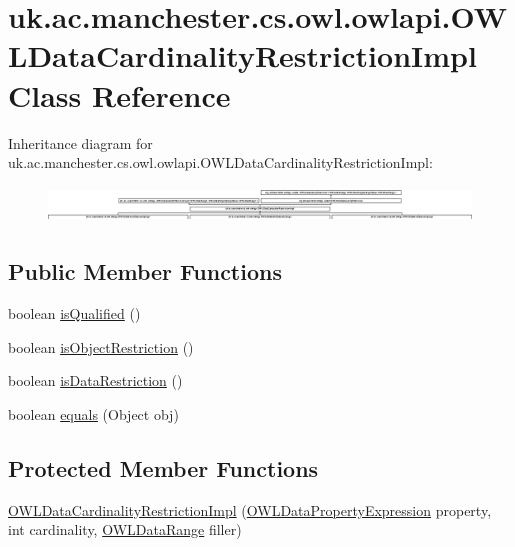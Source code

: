 \hypertarget{classuk_1_1ac_1_1manchester_1_1cs_1_1owl_1_1owlapi_1_1_o_w_l_data_cardinality_restriction_impl}{\section{uk.\-ac.\-manchester.\-cs.\-owl.\-owlapi.\-O\-W\-L\-Data\-Cardinality\-Restriction\-Impl Class Reference}
\label{classuk_1_1ac_1_1manchester_1_1cs_1_1owl_1_1owlapi_1_1_o_w_l_data_cardinality_restriction_impl}
}
Inheritance diagram for uk.\-ac.\-manchester.\-cs.\-owl.\-owlapi.\-O\-W\-L\-Data\-Cardinality\-Restriction\-Impl\-:\begin{figure}[H]
\begin{center}
\leavevmode
\includegraphics[height=0.965934cm]{classuk_1_1ac_1_1manchester_1_1cs_1_1owl_1_1owlapi_1_1_o_w_l_data_cardinality_restriction_impl}
\end{center}
\end{figure}
\subsection*{Public Member Functions}
\begin{DoxyCompactItemize}
\item 
boolean \hyperlink{classuk_1_1ac_1_1manchester_1_1cs_1_1owl_1_1owlapi_1_1_o_w_l_data_cardinality_restriction_impl_acfef886d21539b2b92979103cde62ceb}{is\-Qualified} ()
\item 
boolean \hyperlink{classuk_1_1ac_1_1manchester_1_1cs_1_1owl_1_1owlapi_1_1_o_w_l_data_cardinality_restriction_impl_af54b46b0237a6928287de2c943ef36b1}{is\-Object\-Restriction} ()
\item 
boolean \hyperlink{classuk_1_1ac_1_1manchester_1_1cs_1_1owl_1_1owlapi_1_1_o_w_l_data_cardinality_restriction_impl_ab6c2babe6c708512d0b023c000a4e015}{is\-Data\-Restriction} ()
\item 
boolean \hyperlink{classuk_1_1ac_1_1manchester_1_1cs_1_1owl_1_1owlapi_1_1_o_w_l_data_cardinality_restriction_impl_a544695b3169c60a0f6e4ab1f11d48165}{equals} (Object obj)
\end{DoxyCompactItemize}
\subsection*{Protected Member Functions}
\begin{DoxyCompactItemize}
\item 
\hyperlink{classuk_1_1ac_1_1manchester_1_1cs_1_1owl_1_1owlapi_1_1_o_w_l_data_cardinality_restriction_impl_a294d0e6e65824a4c477012bf6bef37ee}{O\-W\-L\-Data\-Cardinality\-Restriction\-Impl} (\hyperlink{interfaceorg_1_1semanticweb_1_1owlapi_1_1model_1_1_o_w_l_data_property_expression}{O\-W\-L\-Data\-Property\-Expression} property, int cardinality, \hyperlink{interfaceorg_1_1semanticweb_1_1owlapi_1_1model_1_1_o_w_l_data_range}{O\-W\-L\-Data\-Range} filler)
\end{DoxyCompactItemize}
